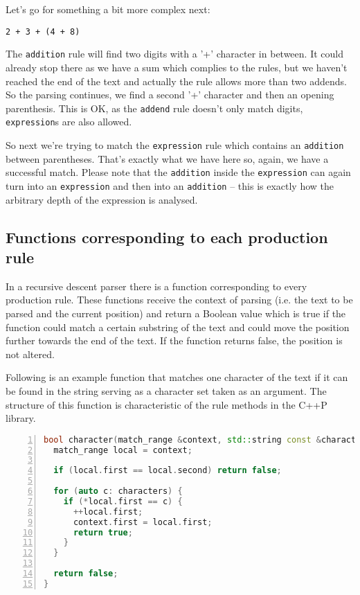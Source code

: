 \documentclass[12pt]{article}
\begin{document}
Let's go for something a bit more complex next:

\begin{center}
	\begin{minipage}[h]{0.2\textwidth}
		\begin{lstlisting}[breaklines=true]
2 + 3 + (4 + 8)
		\end{lstlisting}
	\end{minipage}
\end{center}

The \texttt{addition} rule will find two digits with a '+' character in between. It could already stop there
as we have a sum which complies to the rules, but we haven't reached the end of the text and actually the
rule allows more than two addends. So the parsing continues, we find a second '+' character and then an
opening parenthesis. This is OK, as the \texttt{addend} rule doesn't only match digits, \texttt{expression}s
are also allowed.

So next we're trying to match the \texttt{expression} rule which contains an \texttt{addition} between
parentheses. That's exactly what we have here so, again, we have a successful match. Please note that the
\texttt{addition} inside the \texttt{expression} can again turn into an \texttt{expression} and then into an
\texttt{addition} -- this is exactly how the arbitrary depth of the expression is analysed.

\subsection*{Functions corresponding to each production rule}
In a recursive descent parser there is a function corresponding to every production rule. These functions
receive the context of parsing (i.e. the text to be parsed and the current position) and return a Boolean
value which is true if the function could match a certain substring of the text and could move the position
further towards the end of the text. If the function returns false, the position is not altered.

Following is an example function that matches one character of the text if it can be found in the string
serving as a character set taken as an argument. The structure of this function is characteristic of the
rule methods in the C++P library.

\begin{center}
	\begin{minipage}[h]{0.8\textwidth}
		\begin{lstlisting}[language=C++, breaklines=true, numbers=left]
bool character(match_range &context, std::string const &characters) {
  match_range local = context;

  if (local.first == local.second) return false;

  for (auto c: characters) {
    if (*local.first == c) {
      ++local.first;
      context.first = local.first;
      return true;
    }
  }

  return false;
}
		\end{lstlisting}
	\end{minipage}
\end{center}
\end{document}
